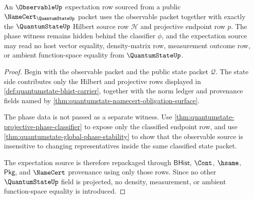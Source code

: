\begin{theorem}
\label{thm:quantumstate-observable-expectation-source}
An $\ObservableUp$ expectation row sourced from a public
$\NameCert_{\QuantumStateUp}$ packet uses the observable packet together with
exactly the $\QuantumStateUp$ Hilbert source row $\mathcal{H}$ and projective
endpoint row $p$. The phase witness remains hidden behind the classifier
$\phi$, and the expectation source may read no host vector equality,
density-matrix row, measurement outcome row, or ambient function-space
equality from $\QuantumStateUp$.
\end{theorem}
\begin{proof}
Begin with the observable packet and the public state packet $\mathcal{Q}$.
The state side contributes only the Hilbert and projective rows displayed in
\autoref{def:quantumstate-bhist-carrier}, together with the norm ledger and
provenance fields named by
\autoref{thm:quantumstate-namecert-obligation-surface}.

The phase data is not passed as a separate witness. Use
\autoref{thm:quantumstate-projective-phase-classifier} to expose only the
classified endpoint row, and use
\autoref{thm:quantumstate-global-phase-stability} to show that the observable
source is insensitive to changing representatives inside the same classified
state packet.

The expectation source is therefore repackaged through $\mathsf{BHist}$,
$\Cont$, $\hsame$, $\mathsf{Pkg}$, and $\NameCert$ provenance using only those
rows. Since no other $\QuantumStateUp$ field is projected, no density,
measurement, or ambient function-space equality is introduced.
\end{proof}

